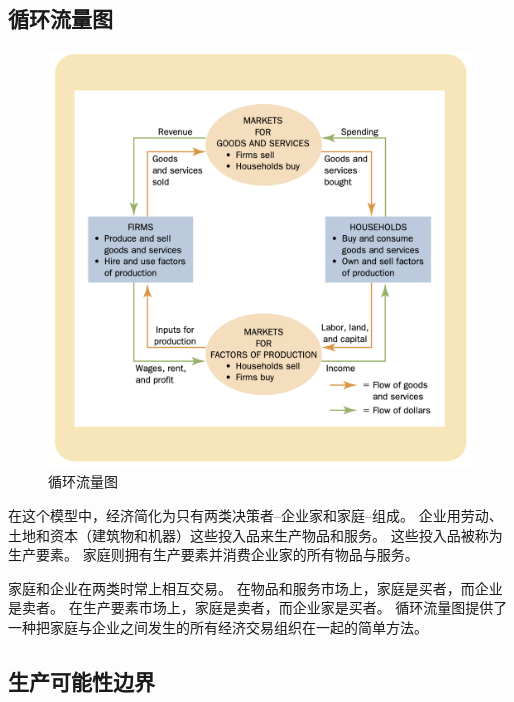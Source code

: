 \subsection{循环流量图}

\begin{figure}[!ht]
  \centering
  \includegraphics[width=\textwidth]{pics/circular-flow}
  \caption{循环流量图}
  \label{fig:circular-flow}
\end{figure}

在这个模型中，经济简化为只有两类决策者--企业家和家庭--组成。
企业用劳动、土地和资本（建筑物和机器）这些投入品来生产物品和服务。
这些投入品被称为生产要素。
家庭则拥有生产要素并消费企业家的所有物品与服务。


家庭和企业在两类时常上相互交易。
在物品和服务市场上，家庭是买者，而企业是卖者。
在生产要素市场上，家庭是卖者，而企业家是买者。
循环流量图提供了一种把家庭与企业之间发生的所有经济交易组织在一起的简单方法。


\subsection{生产可能性边界}

